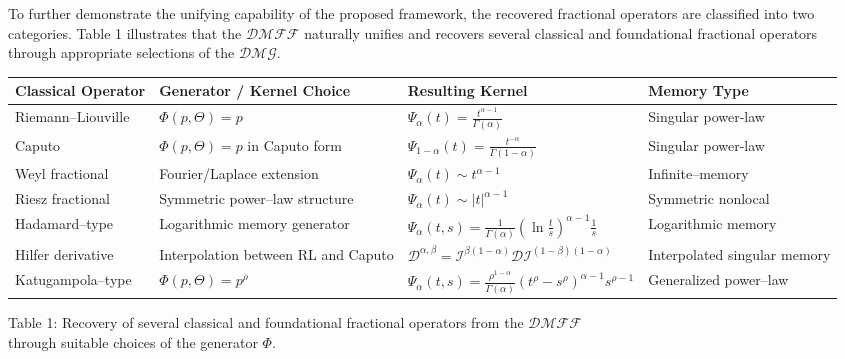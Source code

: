\documentclass[11pt]{article}
\numberwithin{equation}{section}
\begin{document}
\medskip

To further demonstrate the unifying capability of the proposed framework, the recovered fractional operators are classified into two categories. Table 1 illustrates that the $\mathcal{DMFF}$ naturally unifies and recovers
several classical and foundational fractional operators through
appropriate selections of the $\mathcal{DMG}$.


\begin{table}[h!]
\centering
\scriptsize
\renewcommand{\arraystretch}{1.2}

\begin{tabular}{|p{2.9cm}|p{3.2cm}|p{4.5cm}|p{2.3cm}|}
\hline
\textbf{Classical Operator} &
\textbf{Generator / Kernel Choice} &
\textbf{Resulting Kernel} &
\textbf{Memory Type}
\\
\hline

Riemann--Liouville \cite{Podlubny1999} &
$\Phi(p,\Theta)=p$ &
$\displaystyle
\Psi_\alpha(t)=
\frac{t^{\alpha-1}}{\Gamma(\alpha)}
$ &
Singular power-law
\\
\hline

Caputo \cite{Kilbas2006}
   &
$\Phi(p,\Theta)=p$ in Caputo form &
$\displaystyle
\Psi_{1-\alpha}(t)=
\frac{t^{-\alpha}}{\Gamma(1-\alpha)}
$ &
Singular power-law
\\
\hline

Weyl fractional \cite{Samko1993} &
Fourier/Laplace extension &
$\displaystyle
\Psi_\alpha(t)\sim t^{\alpha-1}
$ &
Infinite--memory
\\
\hline

Riesz fractional \cite{Kilbas2006} &
Symmetric power--law structure &
$\displaystyle
\Psi_\alpha(t)\sim |t|^{\alpha-1}
$ &
Symmetric nonlocal
\\
\hline

Hadamard--type \cite{Kilbas2006} &
Logarithmic memory generator &
$\displaystyle
\Psi_\alpha(t,s)=
\frac1{\Gamma(\alpha)}
\left(
\ln\frac ts
\right)^{\alpha-1}
\frac1s
$ &
Logarithmic memory
\\
\hline

Hilfer derivative \cite{Hilfer2000} &
Interpolation between RL and Caputo &
$\displaystyle
\mathcal{D}^{\alpha,\beta}
=
\mathcal{I}^{\beta(1-\alpha)}
\mathcal{D}\mathcal{I}^{(1-\beta)(1-\alpha)}
$ &
Interpolated singular memory
\\
\hline

Katugampola--type   \cite{Katugampola2014}  &
$\Phi(p,\Theta)=p^\rho$ &
$\displaystyle
\Psi_\alpha(t,s)=
\frac{\rho^{1-\alpha}}{\Gamma(\alpha)}
(t^\rho-s^\rho)^{\alpha-1}
s^{\rho-1}
$ &
Generalized power--law
\\
\hline

\end{tabular}

\vspace{1mm}

{\footnotesize
Table 1: Recovery of several classical and foundational fractional operators from the  $\mathcal{DMFF}$ \\
through suitable choices of the generator \(\Phi\).
}

\label{Tab1}

\end{table}
\end{document}
